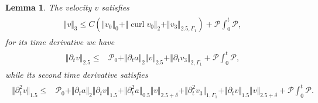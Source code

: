 \documentclass[10pt,reqno]{amsart}
\theoremstyle{plain}
\newtheorem{lemma}[theorem]{Lemma}
\theoremstyle{definition}
\numberwithin{equation}{section}
\newcommand{\ccP}{\mathscr{P}}
\newcommand{\ccPz}{\mathscr{P}_0}
\newcommand{\Ga}{\Gamma}
\newcommand{\de}{\delta}
\newcommand{\curl}{\operatorname{curl}}
\newcommand{\norm}[1]{\Vert#1\Vert}
\begin{document}
{\begin{lemma}
\label{L04}
The velocity $v$  satisfies
\begin{align}
\begin{split}
\norm{ v}_3 \leq C( \norm{v_0}_0 
+ \norm{ \curl v_0}_2 
+ \norm{v_3}_{2.5,\Ga_1})
+ \ccP\int_0^t \ccP  
,
\end{split}
\label{estimate_v_div_curl}
\end{align}
for its time derivative we have
\begin{align}
\begin{split}
\norm{ \partial_t v}_{2.5} 
\leq &  
\ccPz
+ \norm{\partial_t a}_2 \norm{v}_{2.5} + \norm{ \partial_t v_3 }_{2,\Ga_1}
+\ccP\int_{0}^{t}\ccP,
\end{split}
\label{estimate_partial_t_v_div_curl}
\end{align}
while its second time derivative satisfies
\begin{align}
\begin{split}
\norm{ \partial^2_t v}_{1.5} 
\leq  & 
\ccPz
+ \norm{\partial_t a}_2 \norm{\partial_t v}_{1.5} 
+  \norm{\partial^2_t a}_{0.5} \norm{ v}_{2.5+\de} 
+ \norm{ \partial^2_t v_3 }_{1,\Ga_1}
+ \norm{\partial_t v}_{1.5} \norm{v}_{2.5+\de} 
+ \ccP\int_{0}^{t}\ccP
.
\end{split}
\label{estimate_partial_2_t_v_div_curl}
\end{align}
\end{lemma}

}
\end{document}
